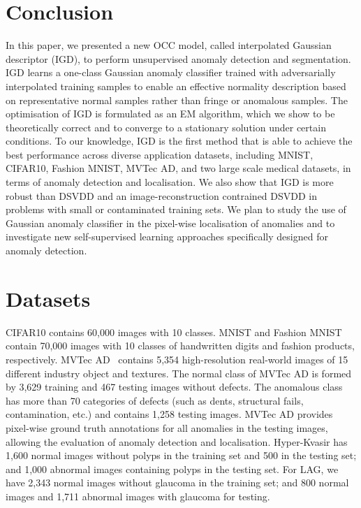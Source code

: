 \documentclass[letterpaper]{article} \usepackage{aaai22}  \usepackage{times}  \usepackage{helvet}  \usepackage{courier}  \usepackage[hyphens]{url}  \usepackage{graphicx} \urlstyle{rm} \def\UrlFont{\rm}  \usepackage{natbib}  \usepackage{caption} \DeclareCaptionStyle{ruled}{labelfont=normalfont,labelsep=colon,strut=off} \frenchspacing  \setlength{\pdfpagewidth}{8.5in}  \setlength{\pdfpageheight}{11in}  \usepackage{algorithm}
\newcommand{\beginsupplement}{\setcounter{table}{0}
        \renewcommand{\thetable}{S\arabic{table}}\setcounter{figure}{0}
        \renewcommand{\thesection}{\Alph{section}}
     }
\begin{document}
\section{Conclusion}



In this paper, we presented a new
OCC model, called interpolated Gaussian descriptor (IGD), to perform unsupervised anomaly detection and segmentation.
IGD learns a one-class Gaussian anomaly classifier trained with adversarially interpolated training samples to enable an effective normality description based on representative normal samples rather than fringe or anomalous samples.
The optimisation of IGD is formulated as an EM algorithm, which we show to be theoretically correct and to converge to a stationary solution under certain conditions.
To our knowledge, IGD is the first method that is able to achieve the best performance across diverse application datasets, including MNIST, CIFAR10, Fashion MNIST, MVTec AD, and two large scale medical datasets, in terms of anomaly detection and localisation. 
We also show that IGD is more robust than DSVDD and an image-reconstruction contrained DSVDD in problems with small or contaminated training sets.
We plan to study the use of Gaussian anomaly classifier in the pixel-wise localisation of anomalies and to investigate new self-supervised learning approaches specifically designed for anomaly detection.

\clearpage
\small{}

\clearpage
\newpage

\beginsupplement
\setcounter{section}{0}
\setcounter{equation}{0}
\setcounter{figure}{0}
\setcounter{table}{0}
\setcounter{page}{1}
\makeatletter
\renewcommand{\theequation}{S\arabic{equation}}
\renewcommand{\thefigure}{S\arabic{figure}}
\newpage

\section{Datasets}
CIFAR10 contains 60,000 images with 10 classes. MNIST and Fashion MNIST contain 70,000 images with 10 classes of handwritten digits and fashion products, respectively. 
MVTec AD~\cite{mvtecad} contains 5,354 high-resolution real-world images of 15 different industry object and textures. The normal class of MVTec AD is formed by 3,629 training and 467 testing images without defects. The anomalous class has more than 70 categories of defects
(such as dents, structural fails, contamination, etc.) and contains 1,258 testing images. MVTec AD provides pixel-wise ground truth annotations for all anomalies in the testing images, allowing the evaluation of anomaly detection and localisation. 
Hyper-Kvasir has 1,600 normal images without polyps in the training set and 500 in the testing set; and 1,000 abnormal images containing polyps in the testing set. For LAG, we have 2,343 normal images without glaucoma in the training set; and 800 normal images and 1,711 abnormal images with glaucoma for testing. 
\end{document}
